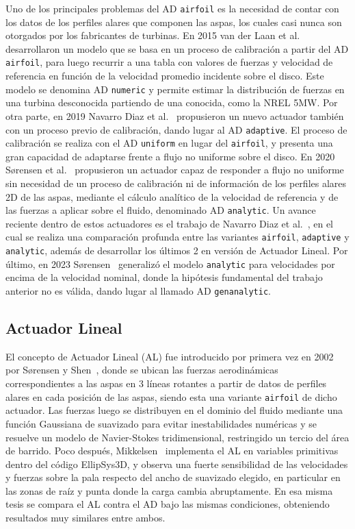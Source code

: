 Uno de los principales problemas del AD \texttt{airfoil} es la necesidad de contar con los datos de los perfiles alares que componen las aspas, los cuales casi nunca son otorgados por los fabricantes de turbinas. En 2015 van der Laan et al.~\cite{vanderlaan2015} desarrollaron un modelo que se basa en un proceso de calibración a partir del AD \texttt{airfoil}, para luego recurrir a una tabla con valores de fuerzas y velocidad de referencia en función de la velocidad promedio incidente sobre el disco. Este modelo se denomina AD \texttt{numeric} y permite estimar la distribución de fuerzas en una turbina desconocida partiendo de una conocida, como la NREL 5MW. Por otra parte, en 2019 Navarro Diaz et al.~\cite{navarrodiaz2019} propusieron un nuevo actuador también con un proceso previo de calibración, dando lugar al AD \texttt{adaptive}. El proceso de calibración se realiza con el AD \texttt{uniform} en lugar del \texttt{airfoil}, y presenta una gran capacidad de adaptarse frente a flujo no uniforme sobre el disco. En 2020 Sørensen et al.~\cite{sorensen2020} propusieron un actuador capaz de responder a flujo no uniforme sin necesidad de un proceso de calibración ni de información de los perfiles alares 2D de las aspas, mediante el cálculo analítico de la velocidad de referencia y de las fuerzas a aplicar sobre el fluido, denominado AD \texttt{analytic}. Un avance reciente dentro de estos actuadores es el trabajo de Navarro Diaz et al.~\cite{navarrodiaz2023}, en el cual se realiza una comparación profunda entre las variantes \texttt{airfoil}, \texttt{adaptive} y \texttt{analytic}, además de desarrollar los últimos 2 en versión de Actuador Lineal. Por último, en 2023 Sørensen~\cite{sorensen2023} generalizó el modelo \texttt{analytic} para velocidades por encima de la velocidad nominal, donde la hipótesis fundamental del trabajo anterior no es válida, dando lugar al llamado AD \texttt{genanalytic}.

\subsection{Actuador Lineal}

El concepto de Actuador Lineal (AL) fue introducido por primera vez en 2002 por Sørensen y Shen~\cite{sorensen2002}, donde se ubican las fuerzas aerodinámicas correspondientes a las aspas en 3 líneas rotantes a partir de datos de perfiles alares en cada posición de las aspas, siendo esta una variante \texttt{airfoil} de dicho actuador. Las fuerzas luego se distribuyen en el dominio del fluido mediante una función Gaussiana de suavizado para evitar inestabilidades numéricas y se resuelve un modelo de Navier-Stokes tridimensional, restringido un tercio del área de barrido. Poco después, Mikkelsen~\cite{mikkelsenThesis2003} implementa el AL en variables primitivas dentro del código EllipSys3D, y observa una fuerte sensibilidad de las velocidades y fuerzas sobre la pala respecto del ancho de suavizado elegido, en particular en las zonas de raíz y punta donde la carga cambia abruptamente. En esa misma tesis se compara el AL contra el AD bajo las mismas condiciones, obteniendo resultados muy similares entre ambos.


